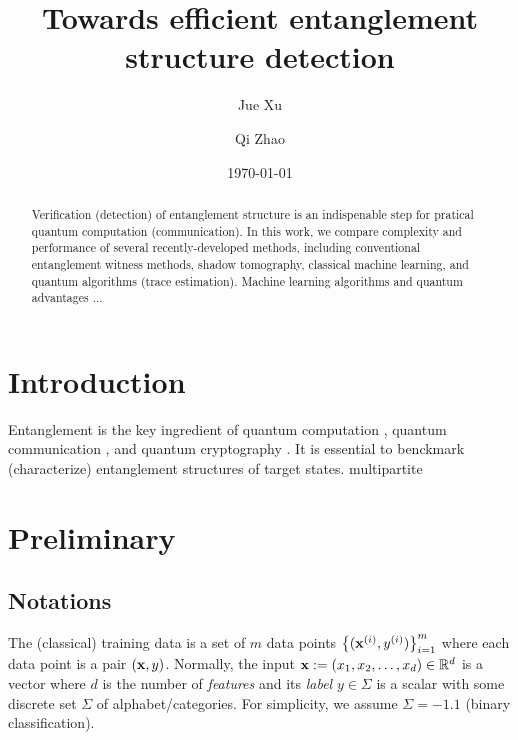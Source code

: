 \documentclass[
aps,
pra,
linenumbers,
floatfix,
]{revtex4-2}
\theoremstyle{plain}
\theoremstyle{definition}
\begin{document}
\title{Towards efficient entanglement structure detection}
\author{Jue Xu}
\author{Qi Zhao}
\date{\today}
\begin{abstract}
	Verification (detection) of entanglement structure is an indispenable step for pratical quantum computation (communication).
	In this work, we compare complexity and performance of several recently-developed methods, including conventional entanglement witness methods, shadow tomography, classical machine learning, and quantum algorithms (trace estimation).
	Machine learning algorithms and quantum advantages ...
\end{abstract}

\maketitle
 \tableofcontents

\section{Introduction}
Entanglement \cite{horodeckiQuantumEntanglement2009} is the key ingredient of quantum computation \cite{}, quantum communication \cite{}, and quantum cryptography \cite{}.
It is essential to benckmark (characterize) entanglement structures of target states.
multipartite

\section{Preliminary}
\subsection{Notations}
The (classical) training data is a set of $m$ data points $\qty{(\vb{x}^{(i)}, y^{(i)})}^{m}_{i=1}$ 
where each data point is a pair $(\vb{x},y)$.
Normally, the input $\vb{x}:= (x_1,x_2,\dots,x_d) \in \mathbb{R}^d$  is a vector where $d$ is the number of \emph{features}
and its \emph{label} $y\in\Sigma$ is a scalar with some discrete set $\Sigma$ of alphabet/categories. 
For simplicity, we assume $\Sigma=\qty{-1,1}$ (binary classification).
\end{document}
